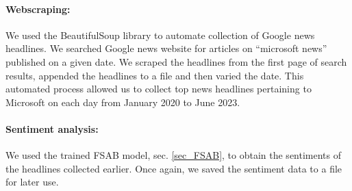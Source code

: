 \documentclass[11pt]{article}
\begin{document}
\paragraph{Webscraping:}{We used the BeautifulSoup library to automate collection of Google news headlines. We searched Google news website for articles on ``microsoft news'' published on a given date. We scraped the headlines from the first page of search results, appended the headlines to a file and then varied the date. This automated process allowed us to collect top news headlines pertaining to Microsoft on each day from January 2020 to June 2023.  }
\paragraph{Sentiment analysis:}{We used the trained FSAB model, sec. \ref{sec_FSAB}, to obtain the sentiments of the headlines collected earlier. Once again, we saved the sentiment data to a file for later use.}
\end{document}
